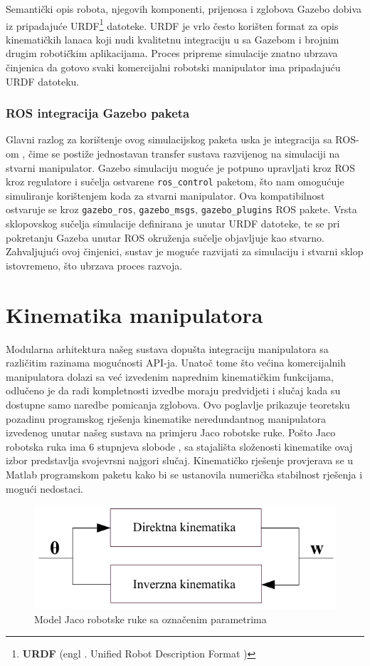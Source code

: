 \documentclass[times, utf8, diplomski, numeric]{fer}
\begin{document}
Semantički opis robota, njegovih komponenti, prijenosa i zglobova Gazebo dobiva iz pripadajuće URDF\footnote{\textbf{URDF} (engl . Unified Robot Description Format )} datoteke.
URDF je vrlo često korišten format za opis kinematičkih lanaca koji nudi kvalitetnu integraciju u sa Gazebom i brojnim drugim robotičkim aplikacijama.
Proces pripreme simulacije znatno ubrzava činjenica da gotovo svaki komercijalni robotski manipulator ima pripadajuću URDF datoteku.

\subsection{ROS integracija Gazebo paketa}
Glavni razlog za korištenje ovog simulacijskog paketa uska je integracija sa ROS-om , čime se postiže jednostavan transfer sustava razvijenog na simulaciji na stvarni manipulator.
Gazebo simulaciju moguće je potpuno upravljati kroz ROS kroz regulatore i sučelja ostvarene \texttt{ros\_control} paketom, što nam omogućuje simuliranje korištenjem koda za stvarni manipulator.
Ova kompatibilnost ostvaruje se kroz \texttt{gazebo\_ros}, \texttt{gazebo\_msgs}, \texttt{gazebo\_plugins}  ROS pakete.
Vrsta sklopovskog sučelja simulacije definirana je unutar URDF datoteke, te se pri pokretanju Gazeba unutar ROS okruženja sučelje objavljuje kao stvarno.
Zahvaljujući ovoj činjenici, sustav je moguće razvijati za simulaciju i stvarni sklop istovremeno, što ubrzava proces razvoja.

\chapter{Kinematika manipulatora}
Modularna arhitektura našeg sustava dopušta integraciju manipulatora sa različitim razinama mogućnosti API-ja.
Unatoč tome što većina komercijalnih manipulatora dolazi sa već izvedenim naprednim kinematičkim funkcijama, odlučeno je da radi kompletnosti izvedbe moraju predvidjeti i slučaj kada su dostupne samo naredbe pomicanja zglobova.
Ovo poglavlje prikazuje teoretsku pozadinu programskog rješenja kinematike neredundantnog manipulatora izvedenog unutar našeg sustava na primjeru Jaco robotske ruke.
Pošto Jaco robotska ruka ima 6 stupnjeva slobode , sa stajališta složenosti kinematike ovaj izbor predstavlja svojevrsni najgori slučaj.
Kinematičko rješenje provjerava se u Matlab programskom paketu kako bi se ustanovila numerička stabilnost rješenja i mogući nedostaci.

\begin{figure}[h!]
\centering
\includegraphics[scale=0.8]{kinematika}
\caption{Model Jaco robotske ruke sa označenim parametrima} \label{h}
\end{figure}
\end{document}
